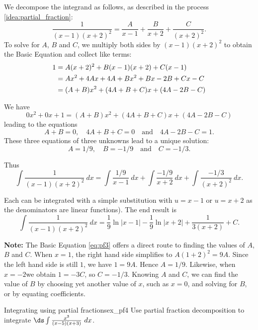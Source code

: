 \begin{solution}
We decompose the integrand as follows, as described in the process \ref{idea:partial_fraction}:
$$\frac{1}{(x-1)(x+2)^2} = \frac{A}{x-1} + \frac{B}{x+2} + \frac{C}{(x+2)^2}.$$
To solve for $A$, $B$ and $C$, we multiply both sides by $(x-1)(x+2)^2$ to obtain the Basic Equation and collect like terms:
\begin{align}
1 &= A(x+2)^2 + B(x-1)(x+2) + C(x-1)\label{eq:pf3}\\
	&= Ax^2+4Ax+4A + Bx^2 + Bx-2B + Cx-C \notag \\
	&= (A+B)x^2 + (4A+B+C)x + (4A-2B-C)\notag
\end{align}


We have $$0x^2+0x+ 1 = (A+B)x^2 + (4A+B+C)x + (4A-2B-C)$$
leading to the equations 
$$A+B = 0, \quad 4A+B+C = 0 \quad \text{and} \quad 4A-2B-C = 1.$$
These three equations of three unknowns lead to a unique solution:
$$A = 1/9,\quad B = -1/9 \quad \text{and} \quad C = -1/3.$$

Thus 
$$\int\frac{1}{(x-1)(x+2)^2}\ dx = \int \frac{1/9}{x-1}\ dx + \int \frac{-1/9}{x+2}\ dx + \int \frac{-1/3}{(x+2)^2}\ dx.$$

Each can be integrated with a simple substitution with $u=x-1$ or $u=x+2$  as the denominators are linear functions). The end result is
$$\int\frac{1}{(x-1)(x+2)^2}\ dx = \frac19\ln|x-1| -\frac19\ln|x+2| +\frac1{3(x+2)}+C.$$

{\textbf{Note:} The Basic Equation \ref{eq:pf3} offers a direct route to finding the values of $A$, $B$ and $C$. When $x=1$, the right hand side simplifies to $A(1+2)^2 = 9A$. Since the left hand side is still $ 1 $, we have $1 = 9A$. Hence $A = 1/9$.  Likewise, when $x=-2$we obtain $1=-3C$, so $C = -1/3$. Knowing $A$ and $C$, we can find the value of $B$ by choosing yet another value of $x$, such as $x=0$, and solving for $B$, or by equating coefficients.}


\end{solution}







\begin{example}{Integrating using partial fractions}{ex_pf4}
{
Use partial fraction decomposition to integrate $\ds \int \frac{x^3}{(x-5)(x+3)}\ dx$.
}
\end{example}

